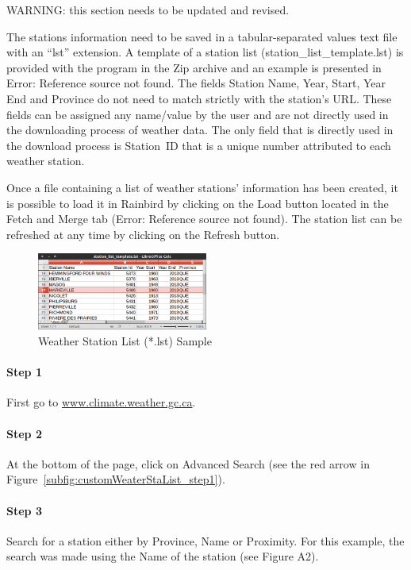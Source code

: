 \documentclass[12pt, letterpaper, fleqn]{report}
\begin{document}
WARNING: this section needs to be updated and revised.

The stations information need to be saved in a tabular-separated values text file with an “lst” extension. A template of a station list (station\_list\_template.lst) is provided with the program in the Zip archive and an example is presented in Error: Reference source not found. The fields Station Name, Year, Start, Year End and Province do not need to match strictly with the station's URL. These fields can be assigned any name/value by the user and are not directly used in the downloading process of weather data. The only field that is directly used in the download process is Station ID that is a unique number attributed to each weather station.

Once a file containing a list of weather stations' information has been created, it is possible to load it in Rainbird by clicking on the  Load button located in the Fetch and Merge tab (Error: Reference source not found). The station list can be refreshed at any time by clicking on the  Refresh button.

\begin{figure}[h!]
\centering
\includegraphics[width=0.5\textwidth]{example_staList}
\caption[Weather Station List (*.lst) Sample]{Weather Station List (*.lst) Sample}
\label{fig:example_staList}
\end{figure}

\paragraph{Step 1} First go to \url{www.climate.weather.gc.ca}.

\paragraph{Step 2} At the bottom of the page, click on Advanced Search (see the red arrow in Figure~\ref{subfig:customWeaterStaList_step1}).

\paragraph{Step 3} Search for a station either by Province, Name or Proximity. For this example, the search was made using the Name of the station (see Figure A2).
\end{document}
